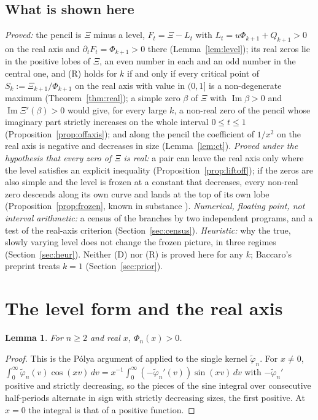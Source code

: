 \documentclass[11pt]{article}
\theoremstyle{plain}
\newtheorem{lemma}[theorem]{Lemma}
\theoremstyle{definition}
\theoremstyle{remark}
\newcommand{\im}{\operatorname{Im}}
\newcommand{\tphi}{\widetilde{\varphi}}
\begin{document}
\subsection{What is shown here}\label{sec:shown}
\emph{Proved:} the pencil is $\Xi$ minus a
level, $F_t = \Xi - L_t$ with $L_t = u\Phi_{k+1} + Q_{k+1} > 0$ on the real
axis and $\partial_t F_t = \Phi_{k+1} > 0$ there (Lemma~\ref{lem:level}); its
real zeros lie in the positive lobes of $\Xi$, an even number in each and an
odd number in the central one, and (R) holds for $k$ if and only if every
critical point of $S_k := \Xi_{k+1}/\Phi_{k+1}$ on the real axis with value in
$(0,1]$ is a non-degenerate maximum (Theorem~\ref{thm:real}); a simple zero
$\beta$ of $\Xi$ with $\im\beta > 0$ and $\im\Xi'(\beta) > 0$ would give, for
every large $k$, a non-real zero of the pencil whose imaginary part strictly
increases on the whole interval $0 \le t \le 1$
(Proposition~\ref{prop:offaxis}); and along the pencil the coefficient of
$1/x^2$ on the real axis is negative and decreases in size
(Lemma~\ref{lem:ct}). \emph{Proved under the hypothesis that every zero of
$\Xi$ is real:} a pair can leave the real axis only where the level satisfies
an explicit inequality (Proposition~\ref{prop:liftoff}); if the zeros are also
simple and the level is frozen at a constant that decreases, every non-real zero
descends along its own curve and lands at the top of its own lobe
(Proposition~\ref{prop:frozen}, known in substance \cite{CS}).
\emph{Numerical, floating point, not interval arithmetic:} a census of the
branches by two independent programs, and a test of the real-axis criterion
(Section~\ref{sec:census}). \emph{Heuristic:} why the true, slowly varying
level does not change the frozen picture, in three regimes
(Section~\ref{sec:heur}). Neither (D) nor (R) is proved here for any $k$;
Baccaro's preprint \cite{Bac} treats $k = 1$ (Section~\ref{sec:prior}).

\section{The level form and the real axis}\label{sec:real}

\begin{lemma}\label{lem:phipos}
For $n \ge 2$ and real $x$, $\Phi_n(x) > 0$.
\end{lemma}

\begin{proof}
This is the P\'olya argument of \cite[Theorem~3.1]{Tya} applied to the single
kernel $\tphi_n$. For $x \ne 0$,
$\int_0^\infty \tphi_n(v)\cos(xv)\,dv
= x^{-1}\int_0^\infty(-\tphi_n'(v))\sin(xv)\,dv$ with $-\tphi_n'$ positive and
strictly decreasing, so the pieces of the sine integral over consecutive
half-periods alternate in sign with strictly decreasing sizes, the first
positive. At $x = 0$ the integral is that of a positive function.
\end{proof}
\end{document}
